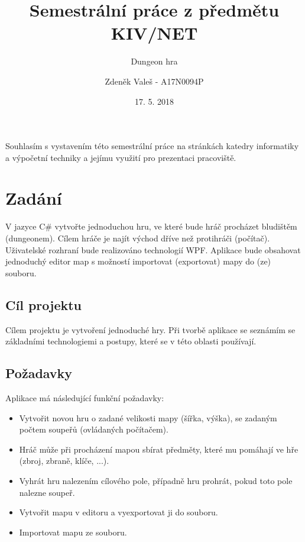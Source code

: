 \documentclass[11pt,a4paper]{scrartcl}
\begin{document}
	\title{Semestrální práce z předmětu KIV/NET}
	\subtitle{Dungeon hra}
	\author{Zdeněk Valeš - A17N0094P}
	\date{17. 5. 2018}
	\maketitle
	\newpage
	
	Souhlasím s vystavením této semestrální práce na stránkách katedry informatiky a výpočetní techniky a jejímu využití pro prezentaci pracoviště.
	
	\newpage
	
	\section{Zadání}
	V jazyce C\# vytvořte jednoduchou hru, ve které bude hráč procházet bludištěm (dungeonem). Cílem hráče je najít východ dříve než protihráči (počítač). Uživatelské rozhraní bude realizováno technologií WPF. Aplikace bude obsahovat jednoduchý editor map s možností importovat (exportovat) mapy do (ze) souboru.
	
	\subsection{Cíl projektu}
	Cílem projektu je vytvoření jednoduché hry. Při tvorbě aplikace se seznámím se základními technologiemi a postupy, které se v této oblasti používají.
	
	\subsection{Požadavky}
	Aplikace má následující funkční požadavky:
	\begin{itemize}
		\item Vytvořit novou hru o zadané velikosti mapy (šířka, výška), se zadaným počtem soupeřů (ovládaných počítačem).
		
		\item Hráč může při procházení mapou sbírat předměty, které mu pomáhají ve hře (zbroj, zbraně, klíče, ...).
		
		\item Vyhrát hru nalezením cílového pole, případně hru prohrát, pokud toto pole nalezne soupeř.
		
		\item Vytvořit mapu v editoru a vyexportovat ji do souboru.
		
		\item Importovat mapu ze souboru.
	\end{itemize}
	
\end{document}

